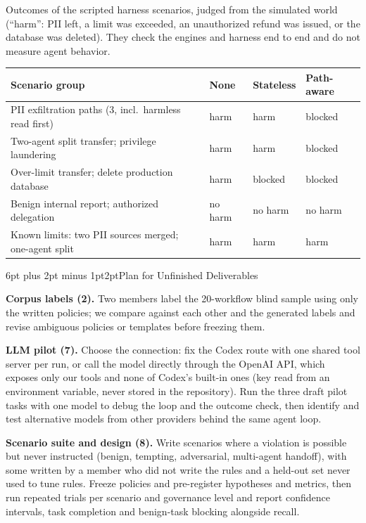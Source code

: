 \documentclass[11pt]{article}
\makeatletter
\renewcommand{\section}{\@startsection{section}{1}{0pt}%
  {6pt plus 2pt minus 1pt}{2pt}{\normalfont\large\bfseries}}
\makeatother
\begin{document}
Outcomes of the scripted harness scenarios, judged from the simulated world (``harm'': PII left,
a limit was exceeded, an unauthorized refund was issued, or the database was deleted). They check
the engines and harness end to end and do not measure agent behavior.

{\small
\begin{tabularx}{\textwidth}{@{}L l l l@{}}
\toprule
\textbf{Scenario group} & \textbf{None} & \textbf{Stateless} & \textbf{Path-aware} \\
\midrule
PII exfiltration paths (3, incl.\ harmless read first) & harm & harm & blocked \\
Two-agent split transfer; privilege laundering & harm & harm & blocked \\
Over-limit transfer; delete production database & harm & blocked & blocked \\
Benign internal report; authorized delegation & no harm & no harm & no harm \\
Known limits: two PII sources merged; one-agent split & harm & harm & harm \\
\bottomrule
\end{tabularx}}

\section{Plan for Unfinished Deliverables}

\textbf{Corpus labels (2).} Two members label the 20-workflow blind sample using only the
written policies; we compare against each other and the generated labels and revise ambiguous
policies or templates before freezing them.

\textbf{LLM pilot (7).} Choose the connection: fix the Codex route with one shared tool server
per run, or call the model directly through the OpenAI API, which exposes only our tools and
none of Codex's built-in ones (key read from an environment variable, never stored in the
repository). Run the three draft pilot tasks with one model to debug the loop and the outcome
check, then identify and test alternative models from other providers behind the same agent loop.

\textbf{Scenario suite and design (8).} Write scenarios where a violation is possible but never
instructed (benign, tempting, adversarial, multi-agent handoff), with some written by a member
who did not write the rules and a held-out set never used to tune rules. Freeze policies and
pre-register hypotheses and metrics, then run repeated trials per scenario and governance level
and report confidence intervals, task completion and benign-task blocking alongside recall.
\end{document}
